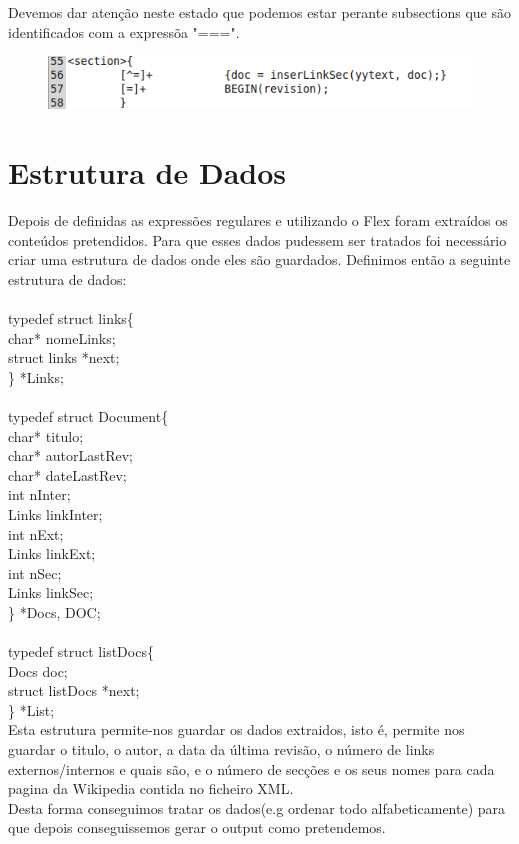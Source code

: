\documentclass[a4paper,11pt,openright,openbib]{report}
\begin{document}
\begin{itemize}
	Devemos dar atenção neste estado que podemos estar perante subsections que são identificados com a expressõa "===".\\
		\begin{figure}[!htb]
		\centering
		\includegraphics[scale=0.5]{imagens/section.png}
	\end{figure} 
\end{itemize}
\newpage
\section{Estrutura de Dados}
Depois de definidas as expressões regulares e utilizando o Flex foram extraídos os conteúdos pretendidos. Para que esses dados pudessem ser tratados foi necessário criar uma estrutura de dados onde eles são guardados.
Definimos então a seguinte estrutura de dados:
\\
\\typedef struct links\{ \\
    char* nomeLinks;\\
	struct links *next;\\
\} *Links;
\\
\\
typedef struct Document\{ \\
	char* titulo;\\
	char* autorLastRev;\\
	char* dateLastRev;\\
	int nInter;\\
	Links linkInter;\\
	int nExt;\\
	Links linkExt;\\
	int nSec;\\
	Links linkSec;\\
\} *Docs, DOC;
\\
\\
typedef struct listDocs\{ \\
	Docs doc;\\
	struct listDocs *next;\\
\} *List;
 \\
 
Esta estrutura permite-nos guardar os dados extraidos, isto é, permite nos guardar o titulo, o autor, a data da última revisão, o número de links externos/internos e quais são, e o número de secções e os seus nomes para cada pagina da Wikipedia contida no ficheiro XML.\\
Desta forma conseguimos tratar os dados(e.g ordenar todo alfabeticamente) para que depois conseguissemos gerar o output como pretendemos.\\
\end{document}
